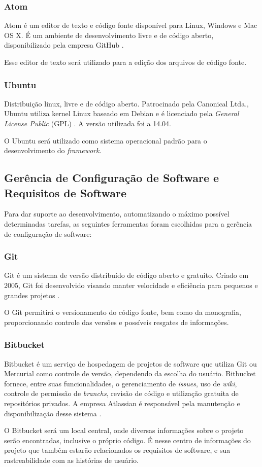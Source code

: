 \subsubsection{Atom}
Atom é um editor de texto e código fonte disponível para Linux, Windows e Mac OS X. É um ambiente de desenvolvimento livre e de código aberto, disponibilizado pela empresa GitHub \cite{atom2015}.
\par
\indent Esse editor de texto será utilizado para a edição dos arquivos de código fonte.

\subsubsection{Ubuntu}
Distribuição linux, livre e de código aberto. Patrocinado pela Canonical Ltda., Ubuntu utiliza kernel Linux baseado em Debian e é licenciado pela \textit{General License Public} (GPL) \cite{ubuntu2010}. A versão utilizada foi a 14.04.
\par
\indent O Ubuntu será utilizado como sistema operacional padrão para o desenvolvimento do \textit{framework}.

\subsection{Gerência de Configuração de Software e Requisitos de Software}
Para dar suporte ao desenvolvimento, automatizando o máximo possível determinadas tarefas, as seguintes ferramentas foram escolhidas para a gerência de configuração de software:

\subsubsection{Git}
Git é um sistema de versão distribuído de código aberto e gratuito. Criado em 2005, Git foi desenvolvido visando manter velocidade e eficiência para pequenos e grandes projetos \cite{git2015}. 
\par
\indent O Git permitirá o versionamento do código fonte, bem como da monografia, proporcionando controle das versões e possíveis resgates de informações.

\subsubsection{Bitbucket}
Bitbucket é um serviço de hospedagem de projetos de software que utiliza Git ou Mercurial como controle de versão, dependendo da escolha do usuário. Bitbucket fornece, entre suas funcionalidades, o gerenciamento de \textit{issues}, uso de \textit{wiki}, controle de permissão de \textit{branchs}, revisão de código e utilização gratuita de repositórios privados. A empresa Atlassian é responsável pela manutenção e disponibilização desse sistema \cite{bitbucket2008}.
\par
\indent O Bitbucket será um local central, onde diversas informações sobre o projeto serão encontradas, inclusive o próprio código. É nesse centro de informações do projeto que também estarão relacionados os requisitos de software, e sua rastreabilidade com as histórias de usuário.

